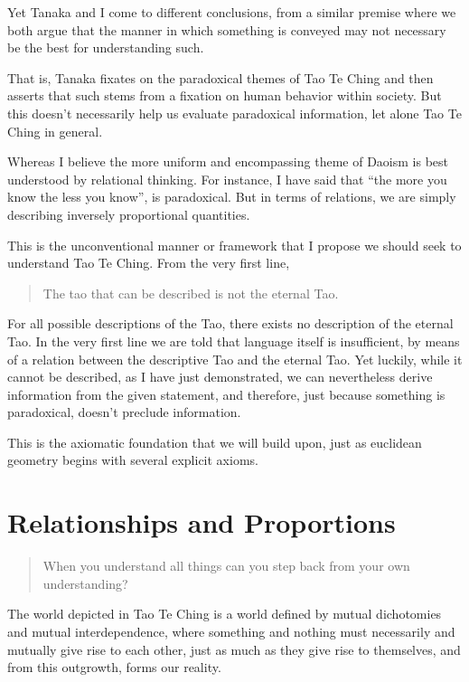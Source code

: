 Yet Tanaka and I come to different conclusions, from a similar premise where we both argue that the manner in which something is conveyed may not necessary be the best for understanding such.

That is, Tanaka fixates on the paradoxical themes of Tao Te Ching and then asserts that such stems from a fixation on human behavior within society. But this doesn’t necessarily help us evaluate paradoxical information, let alone Tao Te Ching in general. 

Whereas I believe the more uniform and encompassing theme of Daoism is best understood by relational thinking. For instance, I have said that “the more you know the less you know”, is paradoxical. But in terms of relations, we are simply describing inversely proportional quantities.

This is the unconventional manner or framework that I propose we should seek to understand Tao Te Ching. From the very first line,
\begin{verse}
The tao that can be described is not the eternal Tao.\\
\end{verse}

For all possible descriptions of the Tao, there exists no description of the eternal Tao. In the very first line we are told that language itself is insufficient, by means of a relation between the descriptive Tao and the eternal Tao. Yet luckily, while it cannot be described, as I have just demonstrated, we can nevertheless derive information from the given statement, and therefore, just because something is paradoxical, doesn't preclude information.

This is the axiomatic foundation that we will build upon, just as euclidean geometry begins with several explicit axioms.


\section{Relationships and Proportions}

\begin{verse}
When you understand all things can you step back from your own understanding?\\
\end{verse}

The world depicted in Tao Te Ching is a world defined by mutual dichotomies and mutual interdependence, where something and nothing must necessarily and mutually give rise to each other, just as much as they give rise to themselves, and from this outgrowth, forms our reality.

